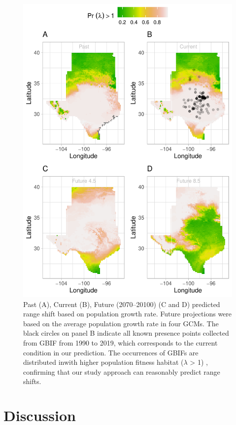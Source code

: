 \documentclass[12pt]{article}
\begin{document}
\begin{figure}%
  \begin{center}
    \includegraphics[width=0.78\linewidth]{Figures/Fig_geoPrlambdaprojection.pdf}
  \caption{Past (A), Current (B), Future (2070–20100) (C and D) predicted range shift based on population growth rate. Future projections were based on the average population growth rate in four GCMs. The black circles on panel B indicate all known presence points collected from GBIF from 1990 to 2019, which corresponds to the current condition in our prediction.  The occurrences of GBIFs are distributed inwith higher population fitness habitat ($\lambda$ > 1) , confirming that our study approach can reasonably predict range shifts. }
  \label{fig:geoproj}
  \end{center}
\end{figure}

\section*{Discussion}


\newpage


\newpage
\clearpage 
\setcounter{equation}{0}
\setcounter{figure}{0}
\setcounter{section}{0}
\setcounter{table}{0}
\renewcommand{\theequation}{S.\arabic{equation}}
\renewcommand{\thetable}{S-\arabic{table}}
\renewcommand{\thefigure}{S-\arabic{figure}}
\renewcommand{\thesection}{S.\arabic{section}}
\end{document}
